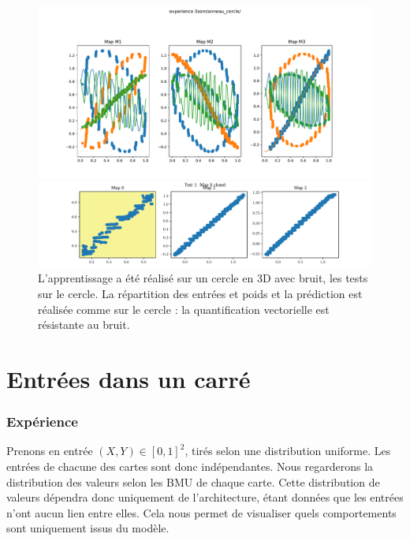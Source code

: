 \begin{figure}
\begin{minipage}{0.5\textwidth}
\includegraphics[width=\textwidth]{3som_anneau_cercle_w.pdf}
\end{minipage}
\begin{minipage}{0.5\textwidth}
\includegraphics[width=\textwidth]{3som_anneau_cercle_pred.pdf}
\end{minipage}
\caption{L'apprentissage a été réalisé sur un cercle en 3D avec bruit, les tests sur le cercle. La répartition des entrées et poids et la prédiction est réalisée comme sur le cercle : la quantification vectorielle est résistante au bruit. }
\label{fig:anneau_cercle}
\end{figure}

\section{Entrées dans un carré}

\subsubsection{Expérience}
Prenons en entrée $(X,Y) \in [0,1]^2$, tirés selon une distribution uniforme. Les entrées de chacune des cartes sont donc indépendantes. Nous regarderons la distribution des valeurs selon les BMU de chaque carte. Cette distribution de valeurs dépendra donc uniquement de l'architecture, étant données que les entrées n'ont aucun lien entre elles. Cela nous permet de visualiser quels comportements sont uniquement issus du modèle.
 
